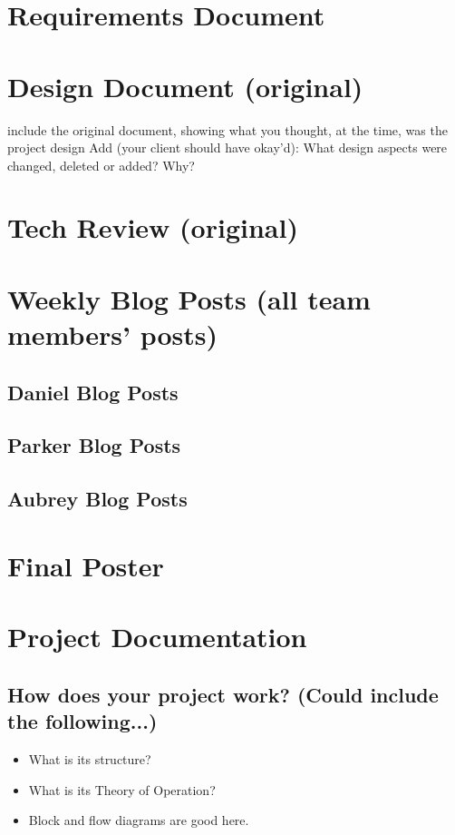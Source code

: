 \documentclass[journal,10pt,onecolumn,compsoc]{IEEEtran}
\begin{document}
    \section{Requirements Document}
    
    
    \section{Design Document (original)}
    
    include the original document, showing what you thought, at the time, was the project design
    Add (your client should have okay'd): What design aspects were changed, deleted or added? Why? 
    \section{Tech Review (original)}
    
	
	
    \section{Weekly Blog Posts (all team members' posts)}
    \subsection{Daniel Blog Posts}
    
	\subsection{Parker Blog Posts}
	
	\subsection{Aubrey Blog Posts}
	
    \section{Final Poster}
    \section{Project Documentation}
    \subsection{How does your project work? (Could include the following...)}
    \begin{itemize}
    \item What is its structure?
    \item What is its Theory of Operation?
    \item Block and flow diagrams are good here.
    \end{itemize}
\end{document}
